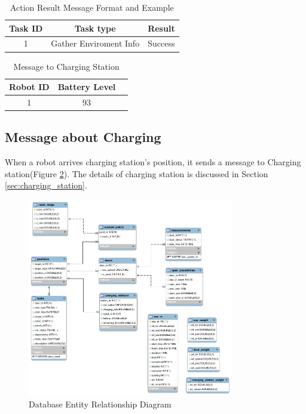 \begin{table}[htb]
\centering
\begin{tabular}{|c|c|c|} 
\hline
Task ID 	& Task type	& Result\\
\hline\hline
1 & Gather Enviroment Info & Success \\ [1ex] 
\hline
\end{tabular}
\caption{Action Result Message Format and Example}
\label{tab:result_message}
\end{table}


\begin{table}[htb]
\centering
\begin{tabular}{|c|c|c|} 
\hline
Robot ID & Battery Level \\
\hline\hline
1 & 93 \\ [1ex] 
\hline
\end{tabular}
\caption{Message to Charging Station}
\label{tab:message_to_charging_staion}
\end{table}

\subsection{Message about Charging}
  
When a robot arrives charging station's position, it sends a message to Charging station(Figure \ref{tab:message_to_charging_staion}). The details of charging station is discussed in Section \ref{sec:charging_station}. 


\begin{figure}[htbp]
    \centering
    \includegraphics[width = 0.8\textwidth]{content/images/ch4/database_er.png}
    \caption{Database Entity Relationship Diagram}
    \label{fig:database_er}
\end{figure}


